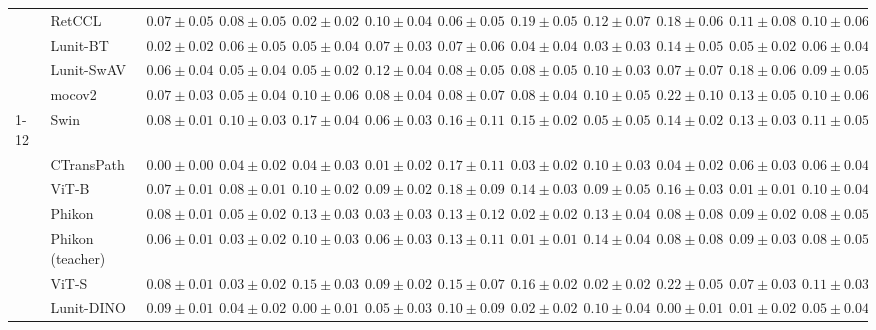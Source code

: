 \begin{tabular}{ll|cccc|c|cccc|c}
 & RetCCL & $0.07 \pm 0.05$ & $0.08 \pm 0.05$ & $\mathbf{0.02 \pm 0.02}$ & $0.10 \pm 0.04$ & $0.06 \pm 0.05$ & $0.19 \pm 0.05$ & $0.12 \pm 0.07$ & $0.18 \pm 0.06$ & $0.11 \pm 0.08$ & $0.10 \pm 0.06$ \\
 & Lunit-BT & $0.02 \pm 0.02$ & $0.06 \pm 0.05$ & $0.05 \pm 0.04$ & $0.07 \pm 0.03$ & $0.07 \pm 0.06$ & $0.04 \pm 0.04$ & $\mathbf{0.03 \pm 0.03}$ & $0.14 \pm 0.05$ & $0.05 \pm 0.02$ & $0.06 \pm 0.04$ \\
 & Lunit-SwAV & $0.06 \pm 0.04$ & $0.05 \pm 0.04$ & $0.05 \pm 0.02$ & $0.12 \pm 0.04$ & $0.08 \pm 0.05$ & $0.08 \pm 0.05$ & $0.10 \pm 0.03$ & $0.07 \pm 0.07$ & $0.18 \pm 0.06$ & $0.09 \pm 0.05$ \\
 & mocov2 & $0.07 \pm 0.03$ & $0.05 \pm 0.04$ & $0.10 \pm 0.06$ & $0.08 \pm 0.04$ & $0.08 \pm 0.07$ & $0.08 \pm 0.04$ & $0.10 \pm 0.05$ & $0.22 \pm 0.10$ & $0.13 \pm 0.05$ & $0.10 \pm 0.06$ \\
\cline{1-12}
\multirow[t]{12}{*}{Mean pool} & Swin & $0.08 \pm 0.01$ & $0.10 \pm 0.03$ & $0.17 \pm 0.04$ & $0.06 \pm 0.03$ & $0.16 \pm 0.11$ & $0.15 \pm 0.02$ & $0.05 \pm 0.05$ & $0.14 \pm 0.02$ & $0.13 \pm 0.03$ & $0.11 \pm 0.05$ \\
 & CTransPath & $\mathbf{0.00 \pm 0.00}$ & $0.04 \pm 0.02$ & $0.04 \pm 0.03$ & $\mathbf{0.01 \pm 0.02}$ & $0.17 \pm 0.11$ & $0.03 \pm 0.02$ & $0.10 \pm 0.03$ & $0.04 \pm 0.02$ & $0.06 \pm 0.03$ & $0.06 \pm 0.04$ \\
 & ViT-B & $0.07 \pm 0.01$ & $0.08 \pm 0.01$ & $0.10 \pm 0.02$ & $0.09 \pm 0.02$ & $0.18 \pm 0.09$ & $0.14 \pm 0.03$ & $0.09 \pm 0.05$ & $0.16 \pm 0.03$ & $\mathbf{0.01 \pm 0.01}$ & $0.10 \pm 0.04$ \\
 & Phikon & $0.08 \pm 0.01$ & $0.05 \pm 0.02$ & $0.13 \pm 0.03$ & $0.03 \pm 0.03$ & $0.13 \pm 0.12$ & $0.02 \pm 0.02$ & $0.13 \pm 0.04$ & $0.08 \pm 0.08$ & $0.09 \pm 0.02$ & $0.08 \pm 0.05$ \\
 & Phikon (teacher) & $0.06 \pm 0.01$ & $0.03 \pm 0.02$ & $0.10 \pm 0.03$ & $0.06 \pm 0.03$ & $0.13 \pm 0.11$ & $\mathbf{0.01 \pm 0.01}$ & $0.14 \pm 0.04$ & $0.08 \pm 0.08$ & $0.09 \pm 0.03$ & $0.08 \pm 0.05$ \\
 & ViT-S & $0.08 \pm 0.01$ & $0.03 \pm 0.02$ & $0.15 \pm 0.03$ & $0.09 \pm 0.02$ & $0.15 \pm 0.07$ & $0.16 \pm 0.02$ & $\mathbf{0.02 \pm 0.02}$ & $0.22 \pm 0.05$ & $0.07 \pm 0.03$ & $0.11 \pm 0.03$ \\
 & Lunit-DINO & $0.09 \pm 0.01$ & $0.04 \pm 0.02$ & $\mathbf{0.00 \pm 0.01}$ & $0.05 \pm 0.03$ & $\mathbf{0.10 \pm 0.09}$ & $0.02 \pm 0.02$ & $0.10 \pm 0.04$ & $\mathbf{0.00 \pm 0.01}$ & $0.01 \pm 0.02$ & $\mathbf{0.05 \pm 0.04}$ \\

\end{tabular}
